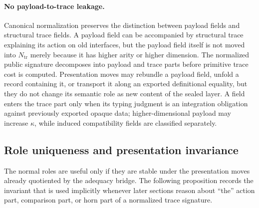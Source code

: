 \documentclass{lmcs}
\begin{document}
\paragraph{No payload-to-trace leakage.}
Canonical normalization preserves the distinction between payload fields and structural trace
fields.  A payload field can be accompanied by structural trace explaining its action on old
interfaces, but the payload field itself is not moved into \(N_{\mathrm{tr}}\) merely because it
has higher arity or higher dimension.
The normalized public signature decomposes into payload and trace parts before primitive trace
cost is computed.  Presentation moves may rebundle a payload field, unfold a record containing
it, or transport it along an exported definitional equality, but they do not change its semantic
role as new content of the sealed layer.  A field enters the trace part only when its typing
judgment is an integration obligation against previously exported opaque data; higher-dimensional
payload may increase \(\kappa\), while induced compatibility fields are classified separately.

\subsection{Role uniqueness and presentation invariance}

The normal roles are useful only if they are stable under the presentation moves already
quotiented by the adequacy bridge.  The following proposition records the invariant that is
used implicitly whenever later sections reason about ``the'' action part, comparison part, or
horn part of a normalized trace signature.
\end{document}
